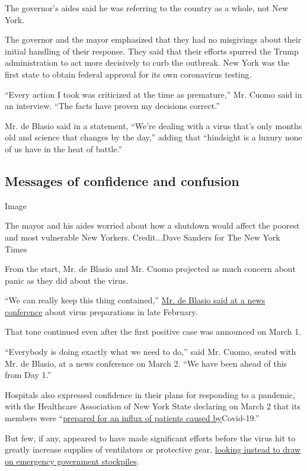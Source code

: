 The governor's aides said he was referring to the country as a whole,
not New York.

The governor and the mayor emphasized that they had no misgivings about
their initial handling of their response. They said that their efforts
spurred the Trump administration to act more decisively to curb the
outbreak. New York was the first state to obtain federal approval for
its own coronavirus testing.

``Every action I took was criticized at the time as premature,'' Mr.
Cuomo said in an interview. ``The facts have proven my decisions
correct.''

Mr. de Blasio said in a statement, ``We're dealing with a virus that's
only months old and science that changes by the day,'' adding that
``hindsight is a luxury none of us have in the heat of battle.''

\hypertarget{messages-of-confidence-and-confusion}{%
\subsection{Messages of confidence and
confusion}\label{messages-of-confidence-and-confusion}}

Image

The mayor and his aides worried about how a shutdown would affect the
poorest and most vulnerable New Yorkers. Credit...Dave Sanders for The
New York Times

From the start, Mr. de Blasio and Mr. Cuomo projected as much concern
about panic as they did about the virus.

``We can really keep this thing contained,''
\href{https://www.nytimes3xbfgragh.onion/2020/02/27/nyregion/new-york-coronavirus.html}{Mr.
de Blasio said at a news conference} about virus preparations in late
February.

That tone continued even after the first positive case was announced on
March 1.

``Everybody is doing exactly what we need to do,'' said Mr. Cuomo,
seated with Mr. de Blasio, at a news conference on March 2. ``We have
been ahead of this from Day 1.''

Hospitals also expressed confidence in their plans for responding to a
pandemic, with the Healthcare Association of New York State declaring on
March 2 that its members were
``\href{https://www.hanys.org/communications/pr/2020/2020-03-02_coronavirus.cfm}{prepared
for an influx of patients caused by}Covid-19.''

But few, if any, appeared to have made significant efforts before the
virus hit to greatly increase supplies of ventilators or protective
gear,
\href{https://www.gnyha.org/wp-content/uploads/2020/03/3_GNYHA-Statement-Hospital-Preparedness-for-Coronavirus.pdf}{looking
instead to draw on emergency government stockpiles}.

